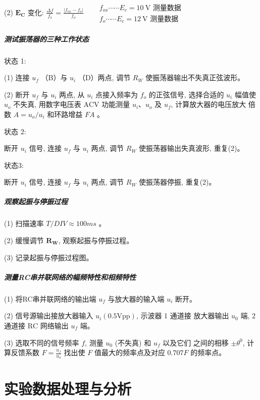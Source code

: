 \documentclass[a4paper,11pt,UTF8]{ctexart}
\begin{document}
(2) $\mathbf{E}_{\mathbf{C}}$ 变化: $\frac{\Delta f}{f_{o}}=\frac{\left|f_{o x}-f_{o}\right|}{f_{o}} \quad \begin{aligned}&f_{o x} \cdots \cdots E_{c}=10 \mathrm{~V} \text { 测量数据 } \\&f_{o} \cdots \cdots E_{c}=12 \mathrm{~V} \text { 测量数据 }\end{aligned}$

\subparagraph{测试振荡器的三种工作状态}

状态 1:


(1) 连接 $u_{f}$ （B）与 $u_{i}$ （D）两点, 调节 $R_{W}$ 使振荡器输出不失真正弦波形。 

(2) 断开 $u_{f}$ 与 $u_{i}$ 两点, 从 $u_{i}$ 点接入频率为 $f_{o}$ 的正弦信号, 选择合适的 $u_{i}$ 幅值使 $u_{o}$ 不失真, 用数字电压表 $\mathrm{ACV}$ 功能测量 $u_{i} 、 u_{o}$ 及 $u_{f}$, 计算放大器的电压放大 倍数 $A=u_{o} / u_{i}$ 和环路增益 $F A$ 。


状态 $2:$


断开 $u_{i}$ 信号, 连接 $u_{f}$ 与 $u_{i}$ 两点, 调节 $R_{W}$ 使振荡器输出失真波形, 重复(2)。 

状态3:


断开 $u_{i}$ 信号, 连接 $u_{f}$ 与 $u_{i}$ 两点, 调节 $R_{W}$ 使振荡器停振, 重复(2)。

\subparagraph{ 观察起振与停振过程}

(1) 扫描速率 $T / D I V \approx 100 m s$ 。


(2) 缓慢调节 $\boldsymbol{R}_{\mathbf{W}}$, 观察起振与停振过程。


(3) 记录起振与停振过程图。

\subparagraph{测量RC串并联网络的幅频特性和相频特性}

(1) 将RC串并联网络的输出端 $u_{f}$ 与放大器的输入端 $u_{i}$ 断开。


(2) 信号源输出接放大器输入 $u_{i}(0.5 \mathrm{Vpp})$, 示波器 1 通道接 放大器输出 $u_{0}$ 端, 2 通道接 $\mathrm{RC}$ 网络输出 $u_{f}$ 端。


(3) 选取不同的信号频率 $f$, 测量 $u_{0}$ (不失真) 和 $u_{f}$ 以及它们 之间的相移 $\pm \theta^{0}$, 计算反馈系数 $F=\frac{u_{f}}{u_{o}}$
找出使 $F$ 值最大的频率点及对应 $0.707 F$ 的频率点。








\section{实验数据处理与分析}
\end{document}
